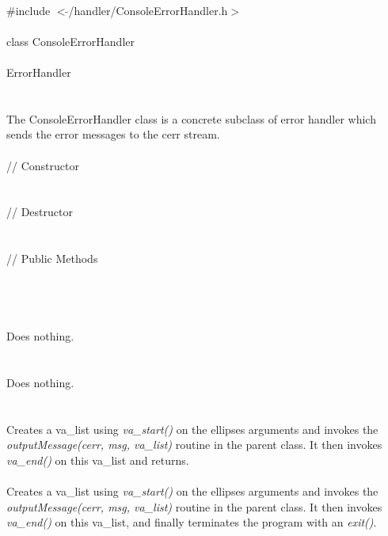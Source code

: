 
   \\
\indent \#include $<\tilde{ }$/handler/ConsoleErrorHandler.h$>$  \\

  \\
\indent class ConsoleErrorHandler \\

 \\
\indent ErrorHandler \\
\indent{} \\

  \\
\indent The ConsoleErrorHandler class is a concrete subclass of error
handler which sends the error messages to the cerr stream. \\

 \\
\indent // Constructor \\
\\ \\
\indent // Destructor \\
\\ \\
\indent // Public Methods  \\
\\
\\ 

  \\
  \\ 
Does nothing.\\

 \\
\\ 
Does nothing. \\

  \\
\\
Creates a va\_list using {\em va\_start()} on the ellipses arguments
and invokes the {\em outputMessage(cerr, msg, va\_list)} routine in
the parent class. It then invokes  {\em va\_end()} on this va\_list
and returns.\\ 

\\
Creates a va\_list using {\em va\_start()} on the ellipses arguments
and invokes the {\em outputMessage(cerr, msg, va\_list)} routine in
the parent class. It then invokes {\em va\_end()} on this va\_list,
and finally terminates the program with an {\em exit()}. 
